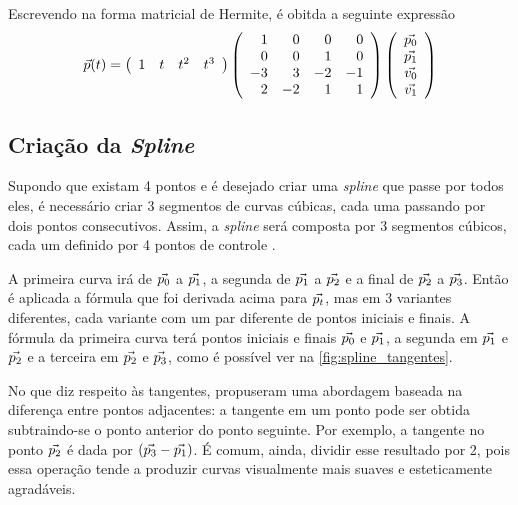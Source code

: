 Escrevendo na forma matricial de Hermite, é obitda a seguinte expressão
\begin{equation}
    {\vec{p}}(t) =  
        \left(
        \begin{array}{rrrr}
            1 & t & t^2 & t^3
        \end{array}\right)
        \left(
        \begin{array}{rrrr}
            1 & 0 & 0 & 0 \\
            0 & 0 & 1 & 0 \\
            -3 & 3 & -2 & -1 \\
                2 & -2 & 1 & 1
        \end{array}\right)
    \left(
        \begin{array}{r}
            {\vec{p_0}} \\
            {\vec{p_1}} \\
            {\vec{v_0}} \\
            {\vec{v_1}}
        \end{array}\right)
 \end{equation}

 \subsection{Criação da \textit{Spline}}

 Supondo que existam 4 pontos e é desejado criar uma \textit{spline} que passe por todos eles, é necessário criar 3 segmentos de curvas cúbicas, cada uma passando por dois pontos consecutivos. Assim, a \textit{spline} será composta por 3 segmentos cúbicos, cada um definido por 4 pontos de controle \cite{CatmullRom}.

 A primeira curva irá de ${\vec{p_0}}$ a ${\vec{p_1}}$, a segunda de ${\vec{p_1}}$ a ${\vec{p_2}}$ e a final de ${\vec{p_2}}$ a ${\vec{p_3}}$. Então é aplicada a fórmula que foi derivada acima para ${\vec{p_t}}$, mas em 3 variantes diferentes, cada variante com um par diferente de pontos iniciais e finais. A fórmula da primeira curva terá pontos iniciais e finais ${\vec{p_0}}$ e ${\vec{p_1}}$, a segunda em ${\vec{p_1}}$ e ${\vec{p_2}}$ e a terceira em ${\vec{p_2}}$ e ${\vec{p_3}}$, como é possível ver na \autoref{fig:spline_tangentes}. 
 
 No que diz respeito às tangentes, \citet{CatmullRom} propuseram uma abordagem baseada na diferença entre pontos adjacentes: a tangente em um ponto pode ser obtida subtraindo-se o ponto anterior do ponto seguinte. Por exemplo, a tangente no ponto ${\vec{p_2}}$ é dada por $({\vec{p_3}} - {\vec{p_1}})$. É comum, ainda, dividir esse resultado por 2, pois essa operação tende a produzir curvas visualmente mais suaves e esteticamente agradáveis.


